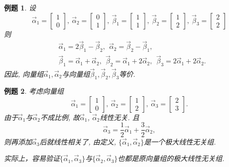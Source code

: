 \documentclass[a4paper]{book}
\newtheorem{eg}{例题}[chapter]
\begin{document}
\begin{eg}
设 $$\vec{\alpha}_1=\begin{bmatrix}1\\0\end{bmatrix},\ \vec{\alpha}_2=\begin{bmatrix}0\\1\end{bmatrix},\ \vec{\beta}_1=\begin{bmatrix}1\\1\end{bmatrix}, \ \vec{\beta}_2=\begin{bmatrix}1\\2\end{bmatrix}, \
\vec{\beta}_3=\begin{bmatrix}2\\2\end{bmatrix} $$
则\begin{displaymath}\begin{aligned}
&\vec{\alpha}_1=2\vec{\beta}_1-\vec{\beta}_2 , \ \ \vec{\alpha}_2=\vec{\beta}_2-\vec{\beta}_1,\\
& \vec{\beta}_1=\vec{\alpha}_1+\vec{\alpha}_2, \ \ \vec{\beta}_2=\vec{\alpha}_1+2\vec{\alpha}_2, \ \ \vec{\beta}_3=2\vec{\alpha}_1+2\vec{\alpha}_2.
\end{aligned}\end{displaymath}
因此, 向量组$\vec{\alpha}_1,\vec{\alpha}_2$与向量组$ \vec{\beta}_1, \vec{\beta}_2, \vec{\beta}_3$等价.
\end{eg}

\begin{eg}
考虑向量组$$\vec{\alpha}_1=\begin{bmatrix}1\\0\end{bmatrix},\ \vec{\alpha}_2=\begin{bmatrix}1\\2\end{bmatrix},\
\vec{\alpha}_3=\begin{bmatrix}2\\3\end{bmatrix}.$$
由于$\vec{\alpha}_1$与$\vec{\alpha}_2$不成比例, 故$\vec{\alpha}_1$, $\vec{\alpha}_2$线性无关. 且$$\vec{\alpha}_3=\frac{1}{2}\vec{\alpha}_1+\frac{3}{2}\vec{\alpha}_2,$$
则再添加$\vec{\alpha}_3$后就线性相关了, 由定义, $\{\vec{\alpha}_1, \vec{\alpha}_2\}$是一个极大线性无关组.

实际上，容易验证$\{\vec{\alpha}_1, \vec{\alpha}_3\}$与$\{\vec{\alpha}_2, \vec{\alpha}_3\}$也都是原向量组的极大线性无关组.
\end{eg}
\end{document}
